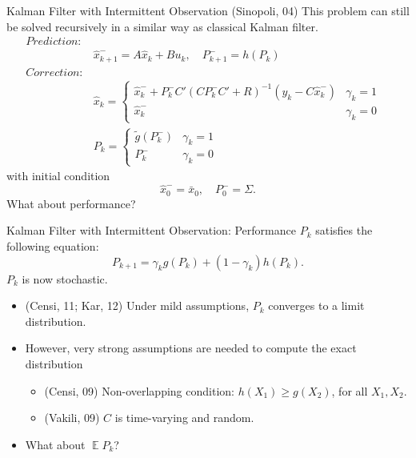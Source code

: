 \documentclass[10pt]{beamer}
\DeclareMathOperator{\1}{\textbf{1}}
\DeclareMathOperator{\E}{\mathbb E}
\begin{document}
\begin{frame}{Kalman Filter with Intermittent Observation}
  (Sinopoli, 04) This problem can still be solved recursively in a similar way as classical Kalman filter. 
  \begin{align*}
    Prediction:&&\\
	       &\hat x _{k + 1}^-  = A \hat x_{k} + Bu_k  , \quad P_{k + 1}^-  = h(P_k)\\
    Correction:&&\\
	       &\hat x_{k} = \begin{cases}
		 \hat x_{k}^-  + P_k^- C'(CP_k^- C'+R)^{-1} (y_k  - C \hat x _{k}^- ) & \gamma_ k = 1\\ 
		 \hat x_{k}^-   & \gamma_ k = 0 
	       \end{cases}\\
	       &P_{k} =\begin{cases}
		 \tilde g(P_k^-) & \gamma_k = 1\\
		 P_k^-&\gamma_k = 0
	       \end{cases}
  \end{align*}
  with initial condition
  \begin{displaymath}
    \hat x_{0}^-  = \bar x_0 ,\quad P_{0}^-  = \Sigma.
  \end{displaymath}
  What about performance?

\end{frame}

\begin{frame}{Kalman Filter with Intermittent Observation: Performance}
  $P_k$ satisfies the following equation:
  \begin{equation}
    P_{k+1}= \gamma_k g(P_k) + (1-\gamma_k) h(P_k).
    \label{eq:basicricattieqn}
  \end{equation}
  $P_k$ is now stochastic. 
  \begin{itemize}
    \item (Censi, 11; Kar, 12) Under mild assumptions, $P_k$ converges to a limit distribution.
    \item However, very strong assumptions are needed to compute the exact distribution 
      \begin{itemize}
	\item (Censi, 09) Non-overlapping condition: $h(X_1)\geq g(X_2)$, for all $X_1,X_2$.
	\item (Vakili, 09) $C$ is time-varying and random.
      \end{itemize}
    \item What about $\E P_k$?
  \end{itemize}
\end{frame}
\end{document}
